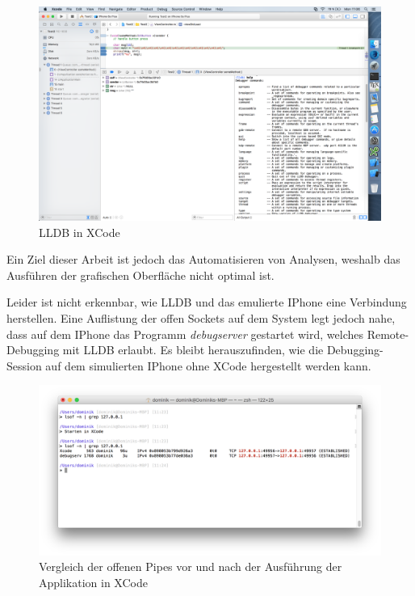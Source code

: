 \begin{figure}[htbp]
	\centering
	\includegraphics[width=\textwidth]{bilder/pentest_mobile_anwendungen/vergleich_aktuelle_situation/20160627_XCode-LLDB.png}
	\caption{LLDB in XCode}
	\label{fig:LLDBinXCode}
\end{figure}
Ein Ziel dieser Arbeit ist jedoch das Automatisieren von Analysen, weshalb das Ausführen der grafischen Oberfläche nicht optimal ist.

Leider ist nicht erkennbar, wie LLDB und das emulierte IPhone eine Verbindung herstellen. Eine Auflistung der offen Sockets auf dem System legt jedoch nahe, dass auf dem IPhone das Programm \textit{debugserver} gestartet wird, welches Remote-Debugging mit LLDB erlaubt. Es bleibt herauszufinden, wie die Debugging-Session auf dem simulierten IPhone ohne XCode hergestellt werden kann.

\begin{figure}[htbp]
	\centering
	\includegraphics[width=\textwidth]{bilder/pentest_mobile_anwendungen/vergleich_aktuelle_situation/20160627_lsof_XCode_running.png}
	\caption{Vergleich der offenen Pipes vor und nach der Ausführung der Applikation in XCode}
	\label{fig:LSOFLLDB}
\end{figure}

